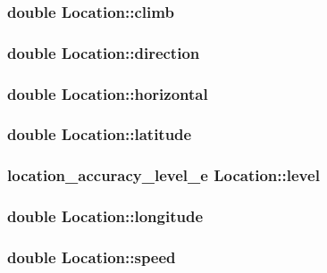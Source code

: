 \subsubsection[{climb}]{\setlength{\rightskip}{0pt plus 5cm}double Location\-::climb}\label{structLocation_a9695d14d0f84614176fbb5bb1a4fc330}
\subsubsection[{direction}]{\setlength{\rightskip}{0pt plus 5cm}double Location\-::direction}\label{structLocation_a37996bc58cf479c57bc69df9a321cdce}
\subsubsection[{horizontal}]{\setlength{\rightskip}{0pt plus 5cm}double Location\-::horizontal}\label{structLocation_aa825a3139b4af389fbbf046230e13513}
\subsubsection[{latitude}]{\setlength{\rightskip}{0pt plus 5cm}double Location\-::latitude}\label{structLocation_aa7fa1116e7a00501032a724156ec946a}
\subsubsection[{level}]{\setlength{\rightskip}{0pt plus 5cm}location\-\_\-accuracy\-\_\-level\-\_\-e Location\-::level}\label{structLocation_aad5c01cc48a4f114cfa58c6577a2c0b9}
\subsubsection[{longitude}]{\setlength{\rightskip}{0pt plus 5cm}double Location\-::longitude}\label{structLocation_a1863cdc6296ff1cb37f4f4cf2d6ada6e}
\subsubsection[{speed}]{\setlength{\rightskip}{0pt plus 5cm}double Location\-::speed}\label{structLocation_afcb6178ec10e610e764eda6c9f214424}
